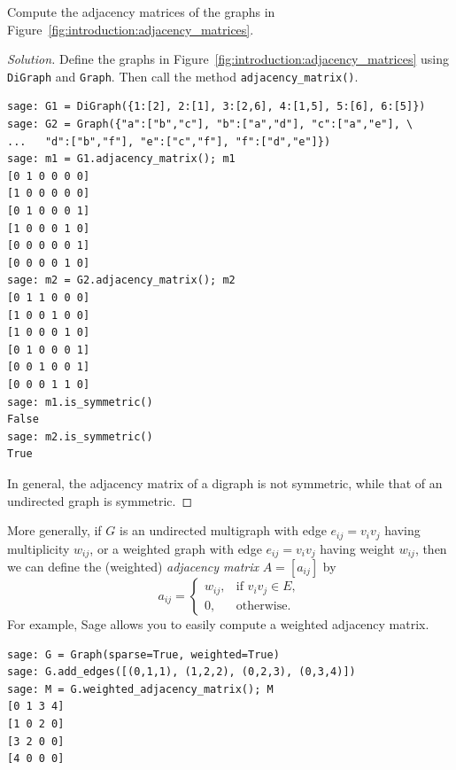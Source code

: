 \begin{example}
Compute the adjacency matrices of the graphs in
Figure~\ref{fig:introduction:adjacency_matrices}.
\end{example}

\begin{proof}[Solution]
Define the graphs in Figure~\ref{fig:introduction:adjacency_matrices}
using \verb!DiGraph! and \verb!Graph!. Then call the method
\verb!adjacency_matrix()!.
%
\begin{lstlisting}
sage: G1 = DiGraph({1:[2], 2:[1], 3:[2,6], 4:[1,5], 5:[6], 6:[5]})
sage: G2 = Graph({"a":["b","c"], "b":["a","d"], "c":["a","e"], \
...   "d":["b","f"], "e":["c","f"], "f":["d","e"]})
sage: m1 = G1.adjacency_matrix(); m1
[0 1 0 0 0 0]
[1 0 0 0 0 0]
[0 1 0 0 0 1]
[1 0 0 0 1 0]
[0 0 0 0 0 1]
[0 0 0 0 1 0]
sage: m2 = G2.adjacency_matrix(); m2
[0 1 1 0 0 0]
[1 0 0 1 0 0]
[1 0 0 0 1 0]
[0 1 0 0 0 1]
[0 0 1 0 0 1]
[0 0 0 1 1 0]
sage: m1.is_symmetric()
False
sage: m2.is_symmetric()
True
\end{lstlisting}
%
In general, the adjacency matrix of a digraph is not symmetric, while
that of an undirected graph is symmetric.
\end{proof}


More generally, if $G$ is an undirected multigraph with edge
$e_{ij} = v_i v_j$ having multiplicity $w_{ij}$, or a weighted
graph with edge $e_{ij} = v_i v_j$ having weight $w_{ij}$, then we
can define the (weighted) \emph{adjacency matrix} $A = [a_{ij}]$ by
\[
a_{ij}
=
\begin{cases}
w_{ij}, & \text{if $v_i v_j \in E$}, \\
0,      & \text{otherwise}.
\end{cases}
\]
For example, Sage allows you to easily compute a weighted adjacency
matrix.
%
\begin{lstlisting}
sage: G = Graph(sparse=True, weighted=True)
sage: G.add_edges([(0,1,1), (1,2,2), (0,2,3), (0,3,4)])
sage: M = G.weighted_adjacency_matrix(); M
[0 1 3 4]
[1 0 2 0]
[3 2 0 0]
[4 0 0 0]
\end{lstlisting}



